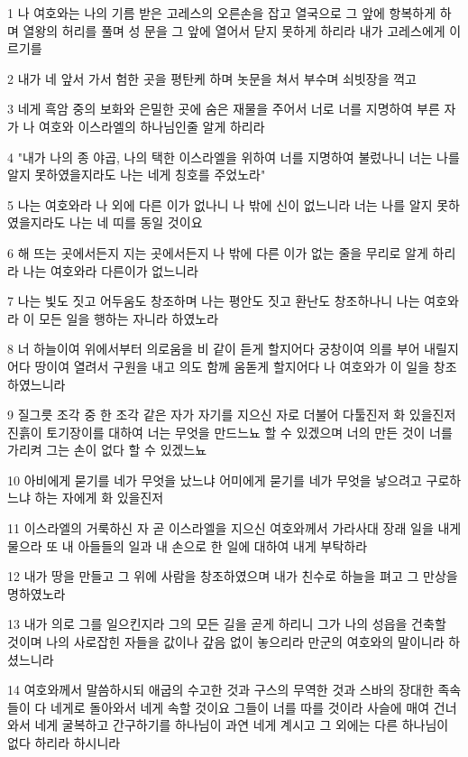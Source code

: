 \par 1 나 여호와는 나의 기름 받은 고레스의 오른손을 잡고 열국으로 그 앞에 항복하게 하며 열왕의 허리를 풀며 성 문을 그 앞에 열어서 닫지 못하게 하리라 내가 고레스에게 이르기를
\par 2 내가 네 앞서 가서 험한 곳을 평탄케 하며 놋문을 쳐서 부수며 쇠빗장을 꺽고
\par 3 네게 흑암 중의 보화와 은밀한 곳에 숨은 재물을 주어서 너로 너를 지명하여 부른 자가 나 여호와 이스라엘의 하나님인줄 알게 하리라
\par 4 "내가 나의 종 야곱, 나의 택한 이스라엘을 위하여 너를 지명하여 불렀나니 너는 나를 알지 못하였을지라도 나는 네게 칭호를 주었노라"
\par 5 나는 여호와라 나 외에 다른 이가 없나니 나 밖에 신이 없느니라 너는 나를 알지 못하였을지라도 나는 네 띠를 동일 것이요
\par 6 해 뜨는 곳에서든지 지는 곳에서든지 나 밖에 다른 이가 없는 줄을 무리로 알게 하리라 나는 여호와라 다른이가 없느니라
\par 7 나는 빛도 짓고 어두움도 창조하며 나는 평안도 짓고 환난도 창조하나니 나는 여호와라 이 모든 일을 행하는 자니라 하였노라
\par 8 너 하늘이여 위에서부터 의로움을 비 같이 듣게 할지어다 궁창이여 의를 부어 내릴지어다 땅이여 열려서 구원을 내고 의도 함께 움돋게 할지어다 나 여호와가 이 일을 창조하였느니라
\par 9 질그릇 조각 중 한 조각 같은 자가 자기를 지으신 자로 더불어 다툴진저 화 있을진저 진흙이 토기장이를 대하여 너는 무엇을 만드느뇨 할 수 있겠으며 너의 만든 것이 너를 가리켜 그는 손이 없다 할 수 있겠느뇨
\par 10 아비에게 묻기를 네가 무엇을 났느냐 어미에게 묻기를 네가 무엇을 낳으려고 구로하느냐 하는 자에게 화 있을진저
\par 11 이스라엘의 거룩하신 자 곧 이스라엘을 지으신 여호와께서 가라사대 장래 일을 내게 물으라 또 내 아들들의 일과 내 손으로 한 일에 대하여 내게 부탁하라
\par 12 내가 땅을 만들고 그 위에 사람을 창조하였으며 내가 친수로 하늘을 펴고 그 만상을 명하였노라
\par 13 내가 의로 그를 일으킨지라 그의 모든 길을 곧게 하리니 그가 나의 성읍을 건축할 것이며 나의 사로잡힌 자들을 값이나 갚음 없이 놓으리라 만군의 여호와의 말이니라 하셨느니라
\par 14 여호와께서 말씀하시되 애굽의 수고한 것과 구스의 무역한 것과 스바의 장대한 족속들이 다 네게로 돌아와서 네게 속할 것이요 그들이 너를 따를 것이라 사슬에 매여 건너와서 네게 굴복하고 간구하기를 하나님이 과연 네게 계시고 그 외에는 다른 하나님이 없다 하리라 하시니라

